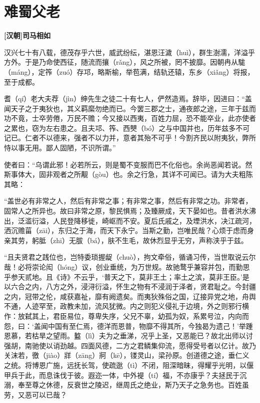 \documentclass[UTF8,titlepage,oneside]{ctexbook}
\begin{document}
\chapter*{难蜀父老}
\begin{center}
	\textbf{[汉朝]司马相如}
\end{center}

汉兴七十有八载，德茂存乎六世，威武纷纭，湛恩汪濊（huì），群生澍濡，洋溢乎方外。于是乃命使西征，随流而攘（rǎng），风之所被，罔不披靡。因朝冉从駹（máng），定筰（zuó）存邛，略斯榆，举苞满，结轨还辕，东乡（xiǎng）将报，至于成都。


耆（qí）老大夫荐（jìn）绅先生之徒二十有七人，俨然造焉。辞毕，因进曰：“盖闻天子之于夷狄也，其义羁縻勿绝而已。今罢三郡之士，通夜郎之途，三年于兹而功不竟，士卒劳倦，万民不赡；今又接以西夷，百姓力屈，恐不能卒业，此亦使者之累也，窃为左右患之。且夫邛、筰、西僰（bó）之与中国并也，历年兹多不可记已。仁者不以德来，强者不以力并，意者其殆不可乎！今割齐民以附夷狄，弊所恃以事无用。鄙人固陋，不识所谓。”


使者曰：“乌谓此邪！必若所云，则是蜀不变服而巴不化俗也。余尚恶闻若说。然斯事体大，固非观者之所觏（gòu）也。余之行急，其详不可闻已。请为大夫粗陈其略：


“盖世必有非常之人，然后有非常之事；有非常之事，然后有非常之功。非常者，固常人之所异也。故曰非常之原，黎民惧焉；及臻厥成，天下晏如也。昔者洪水沸出，泛滥衍溢，人民登降移徙，崎岖而不安。夏后氏戚之，及堙洪水，决江疏河，洒沉赡菑（zāi），东归之于海，而天下永宁。当斯之勤，岂唯民哉？心烦于虑而身亲其劳，躬胝（zhī）无胈（bá），肤不生毛，故休烈显乎无穷，声称浃乎于兹。


“且夫贤君之践位也，岂特委琐握龊（chuò），拘文牵俗，循诵习传，当世取说云尔哉！必将崇论闳（hóng）议，创业垂统，为万世规。故驰鹜乎兼容并包，而勤思乎参天贰地。且《诗》不云乎，‘普天之下，莫非王土；率土之滨，莫非王臣。’是以六合之内，八方之外，浸浔衍溢，怀生之物有不浸润于泽者，贤君耻之。今封疆之内，冠带之伦，咸获嘉祉，靡有阙遗矣。而夷狄殊俗之国，辽接异党之地，舟舆不通，人迹罕至，政教未加，流风犹微。内之则犯义侵礼于边境，外之则邪行横作：放弑其上，君臣易位，尊卑失序，父兄不辜，幼孤为奴，系累号泣，内向而怨，曰：‘盖闻中国有至仁焉，德洋而恩普，物靡不得其所，今独曷为遗己！’举踵恩慕，若枯旱之望雨。盭（lì）夫为之垂涕，况乎上圣，又恶能已？故北出师以讨强胡，南驰使以诮劲越。四面风德，二方之君鳞集仰流，愿得受号者以亿计。故乃关沫若，徼（jiào）牂（zāng）牁（kē），镂灵山，梁孙原。创道德之途，垂仁义之统。将博恩广施，远抚长驾，使疏逖（tì）不闭，阻深暗昧，得耀乎光明，以偃甲兵于此，而息诛伐于彼。遐迩一体，中外褆（tí）福，不亦康乎？夫拯民于沉溺，奉至尊之休德，反衰世之陵迟，继周氏之绝业，斯乃天子之急务也。百姓虽劳，又恶可以已哉？
\end{document}
